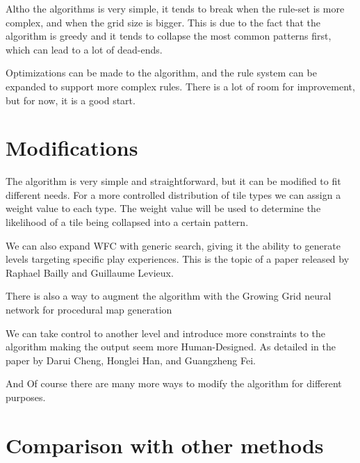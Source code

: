\documentclass[10pt,oneside,a4paper]{article}
\begin{document}
Altho the algorithms is very simple, it tends to break when the rule-set is more complex, and when the grid size is bigger.
This is due to the fact that the algorithm is greedy and it tends to collapse the most common patterns first, which can lead to a lot of dead-ends.

Optimizations can be made to the algorithm, and the rule system can be expanded to support more complex rules.
There is a lot of room for improvement, but for now, it is a good start.

\section{Modifications}\label{sec:modifications}
The algorithm is very simple and straightforward, but it can be modified to fit different needs.
For a more controlled distribution of tile types we can assign a weight value to each type.
The weight value will be used to determine the likelihood of a tile being collapsed into a certain pattern.

We can also expand WFC with generic search, giving it the ability to generate levels targeting specific play experiences.
This is the topic of a paper released by Raphael Bailly and Guillaume Levieux\cite{BL22}.

There is also a way to augment the algorithm with the Growing Grid neural network for procedural map generation~\cite{NMBP20}

We can take control to another level and introduce more constraints to the algorithm making the output seem more Human-Designed.
As detailed in the paper by Darui Cheng, Honglei Han, and Guangzheng Fei\cite{CHF20}.

And Of course there are many more ways to modify the algorithm for different purposes.

\section{Comparison with other methods}\label{sec:comparison}
\end{document}
